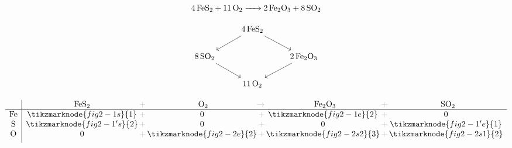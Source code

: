 \documentclass{ctexart}
\newcommand{\grayplus}{\,\color{lightgray}+\,}
\newcommand{\grayto}{\,\color{lightgray}\to\,}
\newcommand{\arrowLR}[3]{%
    \draw[->|,red,thick]
    ([xshift=2pt]#1.south east)
    .. controls ++(0.3cm,-0.2cm) and ++(-0.3cm,-0.2cm) ..
    ([xshift=-2pt]#2.south west)
    node[midway,below,blue,font=\small] {#3};
}
\newcommand{\arrowsToOneRL}[4]{%
    \draw[->,red,thick]
    ([xshift=-2pt]#1.south west)
    .. controls ++(-0.3cm,-0.2cm) and ++(0.3cm,-0.2cm) ..
    ([xshift=2pt]#3.south east)
    node[midway,below,blue,font=\small] {#4};
    \draw[->,red,thick]
    (#2.south)
    .. controls ++(-0.3cm,-0.2cm) and ++(0.3cm,-0.2cm) ..
    ([xshift=2pt]#3.south east);
}
\begin{document}
\begin{center}
    \noindent
    \begin{minipage}[c]{0.4\textwidth}
        \[
            \ce{4FeS2 + 11O2 -> 2Fe2O3 + 8SO2}
        \]

        \[
            \begin{tikzcd}
                & \ce{4FeS2} \arrow[dl] \arrow[dr] & \\
                \ce{8SO2} \arrow[dr] & & \ce{2Fe2O3} \arrow[dl] \\
                & \ce{11O2} &
            \end{tikzcd}
        \]
    \end{minipage}%
    \hspace{0.01\textwidth}
    \begin{minipage}[c]{0.4\textwidth}
        \[
            \begin{array}{c|*{3}{c@{\grayplus}}c}
                & \multicolumn{1}{c@{\grayplus}}{\ce{FeS2}} &
                \multicolumn{1}{c@{\grayto}}{\ce{O2}} &
                \multicolumn{1}{c@{\grayplus}}{\ce{Fe2O3}} &
                \multicolumn{1}{c}{\ce{SO2}} \\
                \hline
                \ce{Fe} & \tikzmarknode{fig2-1s}{1} & 0 &
                \tikzmarknode{fig2-1e}{2} & 0\\
                \ce{S} & \tikzmarknode{fig2-1's}{2} & 0 & 0 &
                \tikzmarknode{fig2-1'e}{1}\\
                \ce{O} & 0 & \tikzmarknode{fig2-2e}{2} &
                \tikzmarknode{fig2-2s2}{3} &
                \tikzmarknode{fig2-2s1}{2}\\[1ex]
            \end{array}
        \]
    \end{minipage}
\end{center}
\end{document}
